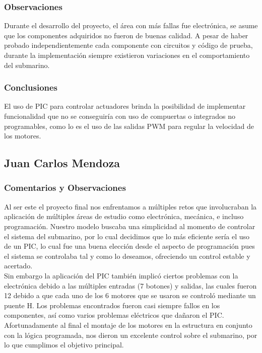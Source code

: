 \subsubsection{Observaciones}
Durante el desarrollo del proyecto, el \'area con m\'as fallas fue electr\'onica, se asume que los componentes adquiridos
no fueron de buenas calidad. A pesar de haber probado independientemente cada componente con circuitos y c\'odigo de prueba,
durante la implementaci\'on siempre existieron variaciones en el comportamiento del submarino.

\subsubsection{Conclusiones}
El uso de PIC para controlar actuadores brinda la posibilidad de implementar funcionalidad que no se conseguir\'ia con
uso de compuertas o integrados no programables, como lo es el uso de las salidas PWM para regular la velocidad de los
motores.

\subsection{Juan Carlos Mendoza}
\subsubsection{Comentarios y Observaciones}
Al ser este el proyecto final nos enfrentamos a m\'ultiples retos que involucraban la aplicaci\'on de m\'ultiples \'areas de
estudio como electr\'onica, mec\'anica, e incluso programaci\'on. Nuestro modelo buscaba una simplicidad al momento de
controlar el sistema del submarino, por lo cual decidimos que lo m\'as eficiente ser\'ia el uso de un PIC, lo cual fue una
buena elecci\'on desde el aspecto de programaci\'on pues el sistema se controlaba tal y como lo deseamos, ofreciendo un control
estable y acertado.\\

Sin embargo la aplicaci\'on del PIC tambi\'en implic\'o ciertos problemas con la electr\'onica debido a las
m\'ultiples entradas (7 botones) y salidas, las cuales fueron 12 debido a que cada uno de los 6 motores que se usaron se
control\'o mediante un puente H. Los problemas encontrados fueron casi siempre fallos en los componentes, as\'i como varios
problemas el\'ectricos que da\~naron el PIC. Afortunadamente al final el montaje de los motores en la estructura en conjunto
con la l\'ogica programada, nos dieron un excelente control sobre el submarino, por lo que cumplimos el objetivo principal.

